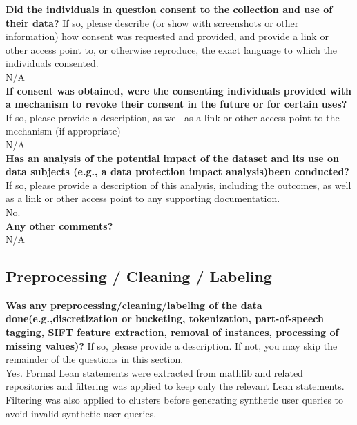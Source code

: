     \textcolor{\sectioncolor}{\textbf{Did the individuals in question consent to the collection and use of their
    data?
    }
    If so, please describe (or show with screenshots or other information) how
    consent was requested and provided, and provide a link or other access
    point to, or otherwise reproduce, the exact language to which the
    individuals consented.
    } \\
    N/A \\
    
    \textcolor{\sectioncolor}{\textbf{If consent was obtained, were the consenting individuals provided with a
    mechanism to revoke their consent in the future or for certain uses?
    }
     If so, please provide a description, as well as a link or other access
     point to the mechanism (if appropriate)
    } \\
    N/A \\
    
    \textcolor{\sectioncolor}{\textbf{Has an analysis of the potential impact of the dataset and its use on data
    subjects (e.g., a data protection impact analysis)been conducted?
    }
    If so, please provide a description of this analysis, including the
    outcomes, as well as a link or other access point to any supporting
    documentation.
    } \\
    No.\\
    
    \textcolor{\sectioncolor}{\textbf{Any other comments?
    }}\\ N/A \\

\subsection{Preprocessing / Cleaning / Labeling}

    \textcolor{\sectioncolor}{\textbf{Was any preprocessing/cleaning/labeling of the data
    done(e.g.,discretization or bucketing, tokenization, part-of-speech
    tagging, SIFT feature extraction, removal of instances, processing of
    missing values)?
    }
    If so, please provide a description. If not, you may skip the remainder of
    the questions in this section.
    } \\
    Yes. Formal Lean statements were extracted from mathlib and related repositories and filtering was applied to keep only the relevant Lean statements. Filtering was also applied to clusters before generating synthetic user queries to avoid invalid synthetic user queries.
 \\

